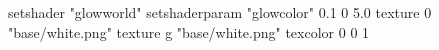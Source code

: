 setshader "glowworld"
setshaderparam "glowcolor" 0.1 0 5.0
   texture 0 "base/white.png"
   texture g "base/white.png"
texcolor 0 0 1
